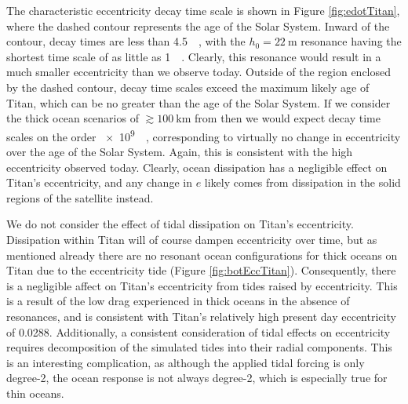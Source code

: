 The characteristic eccentricity decay time scale is shown in Figure \ref{fig:edotTitan}, where the dashed contour represents the age of the Solar System. Inward of the contour, decay times are less than \SI{4.5}{\giga\year}, with the $h_0 = \SI{22}{\metre}$ resonance having the shortest time scale of as little as \SI{1}{\mega\year}. Clearly, this resonance would result in a much smaller eccentricity than we observe today. Outside of the region enclosed by the dashed contour, decay time scales exceed the maximum likely age of Titan, which can be no greater than the age of the Solar System. If we consider the thick ocean scenarios of $\gtrsim \SI{100}{\kilo\metre}$ from \citet{baland2014titan, sohl2014structural} then we would expect decay time scales on the order \SI{e9}{\giga\year}, corresponding to virtually no change in eccentricity over the age of the Solar System. Again, this is consistent with the high eccentricity observed today. Clearly, ocean dissipation has a negligible effect on Titan's eccentricity, and any change in $e$ likely comes from dissipation in the solid regions of the satellite instead. 

We do not consider the effect of tidal dissipation on Titan's eccentricity. Dissipation within Titan will of course dampen eccentricity over time, but as mentioned already there are no resonant ocean configurations for thick oceans on Titan due to the eccentricity tide (Figure \ref{fig:botEccTitan}). Consequently, there is a negligible affect on Titan's eccentricity from tides raised by eccentricity. This is a result of the low drag experienced in thick oceans in the absence of resonances, and is consistent with Titan's relatively high present day eccentricity of \num{0.0288}. Additionally, a consistent consideration of tidal effects on eccentricity requires decomposition of the simulated tides into their radial components. This is an interesting complication, as although the applied tidal forcing is only degree-2, the ocean response is not always degree-2, which is especially true for thin oceans.


